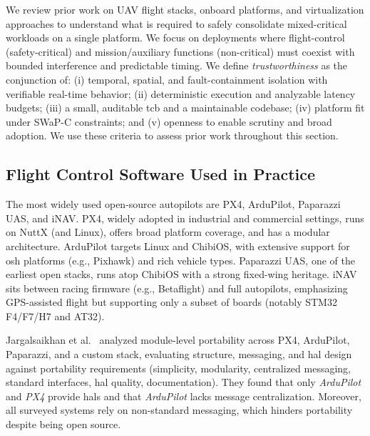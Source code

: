 We review prior work on UAV flight stacks, onboard platforms, and virtualization
approaches to understand what is required to safely consolidate mixed-critical
workloads on a single platform.
We focus on deployments where flight-control (safety-critical) and
mission/auxiliary functions (non-critical) must coexist with bounded
interference and predictable timing.
We define \emph{trustworthiness} as the conjunction of: (i) temporal, spatial,
and fault-containment isolation with verifiable real-time behavior; (ii)
deterministic execution and analyzable latency budgets; (iii) a small, auditable
\gls{tcb} and a maintainable codebase; (iv) platform fit under SWaP-C
constraints; and (v) openness to enable scrutiny and broad adoption.
We use these criteria to assess prior work throughout this section.


\subsection{Flight Control Software Used in Practice}
\label{subsec:rw-flight-stacks}
The most widely used open-source autopilots are PX4, ArduPilot, Paparazzi UAS,
and iNAV.
PX4, widely adopted in industrial and commercial settings, runs on NuttX (and
Linux), offers broad platform coverage, and has a modular architecture.
ArduPilot targets Linux and ChibiOS, with extensive support for \gls{osh}
platforms (e.g., Pixhawk) and rich vehicle types.
Paparazzi UAS, one of the earliest open stacks, runs atop ChibiOS with a strong
fixed-wing heritage.
iNAV sits between racing firmware (e.g., Betaflight) and full autopilots,
emphasizing GPS-assisted flight but supporting only a subset of boards (notably
STM32 F4/F7/H7 and AT32).

Jargalsaikhan et al.~\cite{jargalsaikhan2022architectural} analyzed module-level
portability across PX4, ArduPilot, Paparazzi, and a custom stack, evaluating
structure, messaging, and \gls{hal} design against portability requirements
(simplicity, modularity, centralized messaging, standard interfaces, \gls{hal}
quality, documentation). They found that only \emph{ArduPilot} and \emph{PX4}
provide \glspl{hal} and that \emph{ArduPilot} lacks message
centralization. Moreover, all surveyed systems rely on non-standard messaging,
which hinders portability despite being open source.

